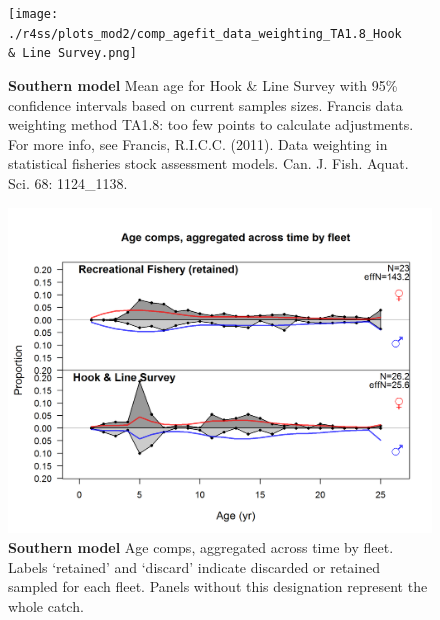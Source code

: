 \documentclass[12pt,]{article}
\begin{document}
\begin{figure}[htbp]
\centering
\texttt{[image: ./r4ss/plots\_mod2/comp\_agefit\_data\_weighting\_TA1.8\_Hook \\\& Line Survey.png]}
\caption{\textbf{Southern model} Mean age for Hook \& Line Survey with
95\% confidence intervals based on current samples sizes. Francis data
weighting method TA1.8: too few points to calculate adjustments. For
more info, see Francis, R.I.C.C. (2011). Data weighting in statistical
fisheries stock assessment models. Can. J. Fish. Aquat. Sci. 68:
1124\_1138.
\label{fig:mod2_8_comp_agefit_data_weighting_TA1.8_Hook & Line Survey}}
\end{figure}

\begin{figure}[htbp]
\centering
\includegraphics{./r4ss/plots_mod2/comp_agefit__aggregated_across_time.png}
\caption{\textbf{Southern model} Age comps, aggregated across time by
fleet. Labels `retained' and `discard' indicate discarded or retained
sampled for each fleet. Panels without this designation represent the
whole catch. \label{fig:mod2_9_comp_agefit__aggregated_across_time}}
\end{figure}
\end{document}
